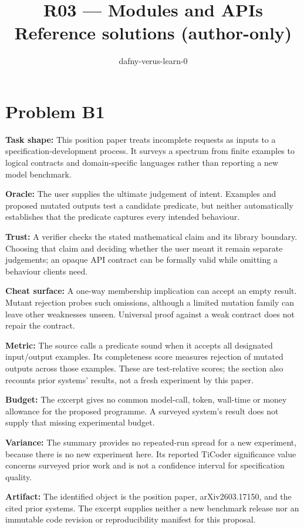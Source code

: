 \documentclass[11pt]{article}
\title{R03 --- Modules and APIs \\ \large Reference solutions (author-only)}
\author{dafny-verus-learn-0}
\date{}
\begin{document}
\maketitle
\section*{Problem B1}\label{ans:B1}
\begin{answer}
\textbf{Task shape:} This position paper treats incomplete requests as inputs to a specification-development process. It surveys a spectrum from finite examples to logical contracts and domain-specific languages rather than reporting a new model benchmark.

\textbf{Oracle:} The user supplies the ultimate judgement of intent. Examples and proposed mutated outputs test a candidate predicate, but neither automatically establishes that the predicate captures every intended behaviour.

\textbf{Trust:} A verifier checks the stated mathematical claim and its library boundary. Choosing that claim and deciding whether the user meant it remain separate judgements; an opaque API contract can be formally valid while omitting a behaviour clients need.

\textbf{Cheat surface:} A one-way membership implication can accept an empty result. Mutant rejection probes such omissions, although a limited mutation family can leave other weaknesses unseen. Universal proof against a weak contract does not repair the contract.

\textbf{Metric:} The source calls a predicate sound when it accepts all designated input/output examples. Its completeness score measures rejection of mutated outputs across those examples. These are test-relative scores; the section also recounts prior systems' results, not a fresh experiment by this paper.

\textbf{Budget:} The excerpt gives no common model-call, token, wall-time or money allowance for the proposed programme. A surveyed system's result does not supply that missing experimental budget.

\textbf{Variance:} The summary provides no repeated-run spread for a new experiment, because there is no new experiment here. Its reported TiCoder significance value concerns surveyed prior work and is not a confidence interval for specification quality.

\textbf{Artifact:} The identified object is the position paper, arXiv2603.17150, and the cited prior systems. The excerpt supplies neither a new benchmark release nor an immutable code revision or reproducibility manifest for this proposal.
\end{answer}
\end{document}
